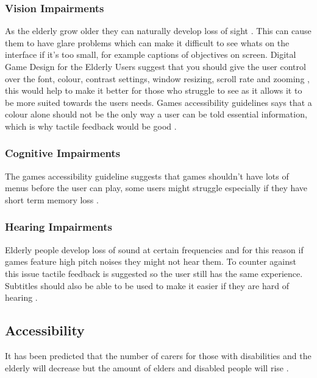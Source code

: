 \documentclass[journal]{IEEEtran}
\begin{document}
\subsubsection{Vision Impairments}
As the elderly grow older they can naturally develop loss of sight \cite{loh_age_2004} \cite{ijsselsteijn_digital_2007}. This can cause them to have glare problems \cite{ijsselsteijn_digital_2007} which can make it difficult to see whats on the interface if it's too small, for example captions of objectives on screen. Digital Game Design for the Elderly Users \cite{ijsselsteijn_digital_2007} suggest that you should give the user control over the font, colour, contrast settings, window resizing, scroll rate and zooming \cite{ijsselsteijn_digital_2007} , this would help to make it better for those who struggle to see as it allows it to be more suited towards the users needs. Games accessibility guidelines \cite{noauthor_game_nodate} says that a colour alone should not be the only way a user can be told essential information, which is why tactile feedback would be good \cite{ijsselsteijn_digital_2007}.

\subsubsection{Cognitive Impairments}
The games accessibility guideline suggests that games shouldn't have lots of menus before the user can play, some users might struggle especially if they have short term memory loss \cite{noauthor_game_nodate}.

\subsubsection{Hearing Impairments}
Elderly people develop loss of sound at certain frequencies \cite{ijsselsteijn_digital_2007} and for this reason if games feature high pitch noises they might not hear them. To counter against this issue tactile feedback is suggested \cite{ijsselsteijn_digital_2007} so the user still has the same experience. Subtitles should also be able to be used to make it easier if they are hard of hearing \cite{noauthor_game_nodate}.

\subsection{Accessibility}
It has been predicted that the number of carers for those with disabilities and the elderly will decrease but the amount of elders and disabled people will rise \cite{hansen_robot_2011}. 
\end{document}
